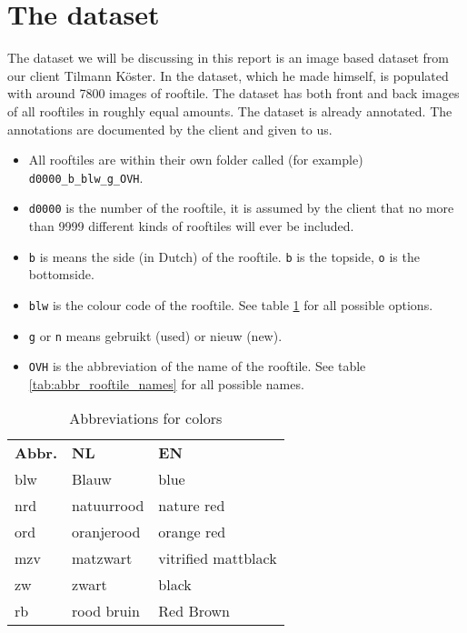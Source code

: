 \section{The dataset}
\begin{fullwidth}
	The dataset we will be discussing in this report is an image based dataset from our client Tilmann Köster. 
	In the dataset, which he made himself, is populated with around 7800 images of rooftile. 
	The dataset has both front and back images of all rooftiles in roughly equal amounts. 
	The dataset is already annotated. The annotations are documented by the client and given to us. 

	\begin{itemize}
		\item All rooftiles are within their own folder called (for example) \verb|d0000_b_blw_g_OVH|.
		\item \verb|d0000| is the number of the rooftile, it is assumed by the client that no more than 9999 different kinds of rooftiles will ever be included.
		\item \verb|b| is means the side (in Dutch) of the rooftile. \verb|b| is the topside, \verb|o| is the bottomside.
		\item \verb|blw| is the colour code of the rooftile. See table \ref{tab:abbr_colours} for all possible options.
		\item \verb|g| or \verb|n| means gebruikt (used) or nieuw (new).
		\item \verb|OVH| is the abbreviation of the name of the rooftile. See table \ref{tab:abbr_rooftile_names} for all possible names.
	\end{itemize}
\end{fullwidth}

\begin{table}[H]
    \begin{tabular}{lll}
        \textbf{Abbr.}        & \textbf{NL}         & \textbf{EN}                  \\
        blw          & Blauw      & blue                \\
        nrd          & natuurrood & nature red          \\
        ord          & oranjerood & orange red          \\
        mzv          & matzwart   & vitrified mattblack \\
        zw           & zwart      & black               \\
        rb           & rood bruin & Red Brown          
    \end{tabular}
    \caption{Abbreviations for colors}
    \label{tab:abbr_colours}
\end{table}

